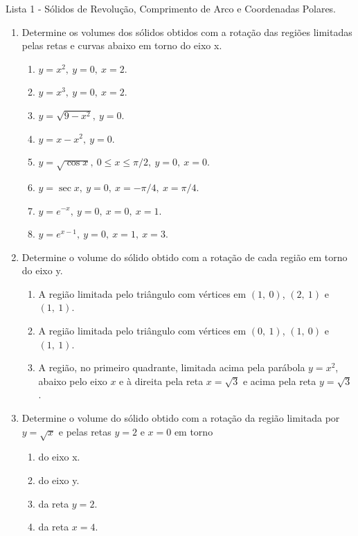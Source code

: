 \documentclass[11pt,a4paper]{article}
\begin{document}
	\begin{center}
		\Large Lista 1 - Sólidos de Revolução, Comprimento de Arco e Coordenadas Polares.
	\end{center}
	

	\begin{enumerate}
	
	\item Determine os volumes dos sólidos obtidos com a rotação das regiões limitadas pelas retas e curvas abaixo em torno do eixo x.
	\begin{enumerate}
	
	\item $y = x^2 \mathrm{, } \ y = 0 \mathrm{, } \ x = 2$.
	\item $y = x^3 \mathrm{, } \ y = 0 \mathrm{, } \ x = 2$.
	\item $y = \sqrt{9 - x^2} \mathrm{, } \ y = 0$.
	\item $y = x - x^2 \mathrm{, } \ y = 0$.
	\item $y = \sqrt{\cos x} \mathrm{, } \ 0 \leq x \leq \pi/2 \mathrm{, } \ y = 0 \mathrm{, } \ x = 0$.
	\item $y = \sec x \mathrm{, } \ y = 0 \mathrm{, } \ x = -\pi/4 \mathrm{, } \ x = \pi/4$.
	\item $y = e^{-x} \mathrm{, } \ y = 0 \mathrm{, } \ x = 0 \mathrm{, } \ x = 1$.
	\item $y = e^{x-1} \mathrm{, } \ y = 0 \mathrm{, } \ x = 1 \mathrm{, } \ x = 3$.
	
	\end{enumerate}
	
	\item Determine o volume do sólido obtido com a rotação de cada região em torno do eixo y. 
	\begin{enumerate}
	\item A região limitada pelo triângulo com vértices em $(1 \mathrm{, } \ 0)$, $(2 \mathrm{, } \ 1)$ e $(1 \mathrm{, } \ 1)$.
	\item A região limitada pelo triângulo com vértices em $(0 \mathrm{, } \ 1)$, $(1 \mathrm{, } \ 0)$ e $(1 \mathrm{, } \ 1)$.
	\item A região, no primeiro quadrante, limitada acima pela parábola $y = x^2$, abaixo pelo eixo $x$ e à direita pela reta $x = \sqrt{3}$ e acima pela reta $y = \sqrt{3}$. 
	\end{enumerate}
	
	\item Determine o volume do sólido obtido com a rotação da região limitada por $y = \sqrt{x}$ e pelas retas $y = 2$ e $x = 0$ em torno
	\begin{enumerate}
	\item do eixo x.
	\item do eixo y.
	\item da reta $y = 2$.
	\item da reta $x = 4$.
	\end{enumerate}
	

\end{enumerate}
\end{document}

